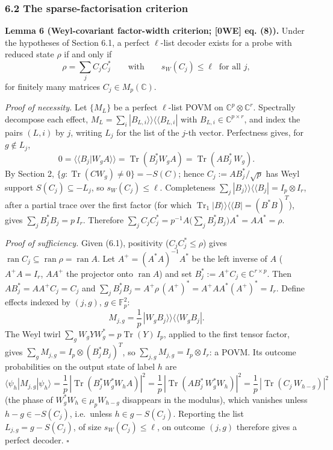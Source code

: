 \documentclass[
  11pt,
  a4paper,
]{article}
\begin{document}
\subsubsection{6.2 The sparse-factorisation
criterion}\label{the-sparse-factorisation-criterion}

\textbf{Lemma 6 (Weyl-covariant factor-width criterion; {[}0WE{]} eq.
(8)).} Under the hypotheses of Section 6.1, a perfect \(\ell\)-list
decoder exists for a probe with reduced state \(\rho\) if and only if
\[\rho=\sum_jC_jC_j^*\qquad\text{with}\qquad s_W(C_j)\le\ell\ \text{ for all }j,\tag{6.1}\]
for finitely many matrices \(C_j\in M_p(\mathbb C)\).

\emph{Proof of necessity.} Let \(\{M_L\}\) be a perfect \(\ell\)-list
POVM on \(\mathbb C^p\otimes\mathbb C^r\). Spectrally decompose each
effect, \(M_L=\sum_i|B_{L,\allowbreak{}i}\rangle\!\rangle\langle\!\langle B_{L,\allowbreak{}i}|\)
with \(B_{L,\allowbreak{}i}\in\mathbb C^{p\times r}\), and index the pairs \((L,\allowbreak{}i)\)
by \(j\), writing \(L_j\) for the list of the \(j\)-th vector.
Perfectness gives, for \(g\notin L_j\),
\[0=\langle\!\langle B_j|W_gA\rangle\!\rangle=\operatorname{Tr}(B_j^*W_gA)=\operatorname{Tr}(AB_j^*\,W_g).\]
By Section 2, \(\{g:\operatorname{Tr}(CW_g)\ne0\}=-S(C)\); hence
\(C_j:=AB_j^*/\sqrt p\) has Weyl support \(S(C_j)\subseteq-L_j\), so
\(s_W(C_j)\le\ell\). Completeness
\(\sum_j|B_j\rangle\!\rangle\langle\!\langle B_j|=I_p\otimes I_r\),
after a partial trace over the first factor (for which
\(\operatorname{Tr}_1|B\rangle\!\rangle\langle\!\langle B|=(B^*B)^{T}\)),
gives \(\sum_jB_j^*B_j=p\,\allowbreak{}I_r\). Therefore
\(\sum_jC_jC_j^*=p^{-1}A\big(\sum_jB_j^*B_j\big)A^*=AA^*=\rho\).

\emph{Proof of sufficiency.} Given (6.1), positivity
(\(C_jC_j^*\le\rho\)) gives
\(\operatorname{ran}C_j\subseteq\operatorname{ran}\rho=\operatorname{ran}A\).
Let \(A^+=(A^*A)^{-1}A^*\) be the left inverse of \(A\) (\(A^+A=I_r\),
\(AA^+\) the projector onto \(\operatorname{ran}A\)) and set
\(B_j^*:=A^+C_j\in\mathbb C^{r\times p}\). Then \(AB_j^*=AA^+C_j=C_j\)
and \(\sum_jB_j^*B_j=A^+\rho\,\allowbreak{}(A^+)^*=A^+AA^*(A^+)^*=I_r\). Define
effects indexed by \((j,\allowbreak{}g)\), \(g\in\mathbb F_p^2\):
\[M_{j,g}=\frac1p\,|W_gB_j\rangle\!\rangle\langle\!\langle W_gB_j|.\]
The Weyl twirl \(\sum_gW_gYW_g^*=p\operatorname{Tr}(Y)\,\allowbreak{}I_p\), applied
to the first tensor factor, gives
\(\sum_gM_{j,\allowbreak{}g}=I_p\otimes(B_j^*B_j)^{T}\), so
\(\sum_{j,\allowbreak{}g}M_{j,\allowbreak{}g}=I_p\otimes I_r\): a POVM. Its outcome probabilities
on the output state of label \(h\) are
\[\langle\psi_h|M_{j,g}|\psi_h\rangle=\frac1p\,|\operatorname{Tr}(B_j^*W_g^*W_hA)|^2=\frac1p\,|\operatorname{Tr}(AB_j^*\,W_g^*W_h)|^2=\frac1p\,|\operatorname{Tr}(C_j\,W_{h-g})|^2\]
(the phase of \(W_g^*W_h\in\mu_pW_{h-g}\) disappears in the modulus),
which vanishes unless \(h-g\in-S(C_j)\), i.e.~unless \(h\in g-S(C_j)\).
Reporting the list \(L_{j,\allowbreak{}g}=g-S(C_j)\), of size \(s_W(C_j)\le\ell\), on
outcome \((j,\allowbreak{}g)\) therefore gives a perfect decoder. \(\square\)
\end{document}
